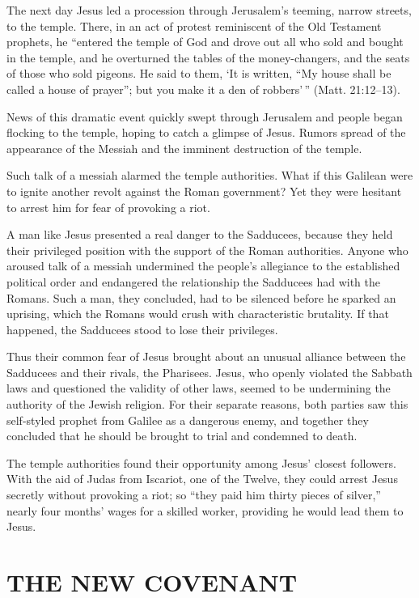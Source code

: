 The next day Jesus led a procession through Jerusalem’s teeming, narrow streets, to the temple.
There, in an act of protest reminiscent of the Old Testament prophets, he “entered the temple of God
and drove out all who sold and bought in the temple, and he overturned the tables of the
money-changers, and the seats of those who sold pigeons. He said to them, ‘It is written, “My house
shall be called a house of prayer”; but you make it a den of robbers’\,” (Matt. 21:12–13).

News of this dramatic event quickly swept through Jerusalem and people began flocking to the temple,
hoping to catch a glimpse of Jesus. Rumors spread of the appearance of the Messiah and the imminent
destruction of the temple.

Such talk of a messiah alarmed the temple authorities. What if this Galilean were to ignite another
revolt against the Roman government? Yet they were hesitant to arrest him for fear of provoking a
riot.

A man like Jesus presented a real danger to the Sadducees, because they held their privileged
position with the support of the Roman authorities. Anyone who aroused talk of a messiah undermined
the people’s allegiance to the established political order and endangered the relationship the
Sadducees had with the Romans. Such a man, they concluded, had to be silenced before he sparked an
uprising, which the Romans would crush with characteristic brutality. If that happened, the
Sadducees stood to lose their privileges.

Thus their common fear of Jesus brought about an unusual alliance between the Sadducees and their
rivals, the Pharisees. Jesus, who openly violated the Sabbath laws and questioned the validity of
other laws, seemed to be undermining the authority of the Jewish religion. For their separate
reasons, both parties saw this self-styled prophet from Galilee as a dangerous enemy, and together
they concluded that he should be brought to trial and condemned to death.

The temple authorities found their opportunity among Jesus’ closest followers. With the aid of Judas
from Iscariot, one of the Twelve, they could arrest Jesus secretly without provoking a riot; so
“they paid him thirty pieces of silver,” nearly four months’ wages for a skilled worker, providing
he would lead them to Jesus.

\section{THE NEW COVENANT}

